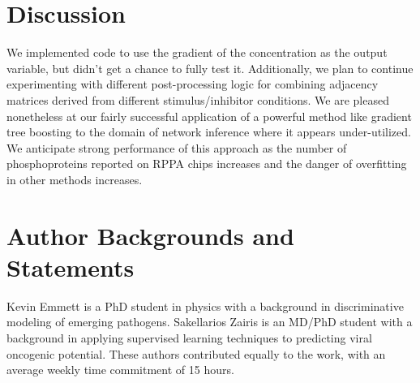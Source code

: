 \documentclass[letterpaper, 11pt]{article}
\begin{document}
\section{Discussion}

We implemented code to use the gradient of the concentration as the output variable, but didn't get a chance to fully test it. Additionally, we plan to continue experimenting with different post-processing logic for combining adjacency matrices derived from different stimulus/inhibitor conditions. We are pleased nonetheless at our fairly successful application of a powerful method like gradient tree boosting to the domain of network inference where it appears under-utilized.  We anticipate strong performance of this approach as the number of phosphoproteins reported on RPPA chips increases and the danger of overfitting in other methods increases.

\section{Author Backgrounds and Statements}

Kevin Emmett is a PhD student in physics with a background in discriminative modeling of emerging pathogens. Sakellarios Zairis is an MD/PhD student with a background in applying supervised learning techniques to predicting viral oncogenic potential.  These authors contributed equally to the work, with an average weekly time commitment of 15 hours.


\end{document}
